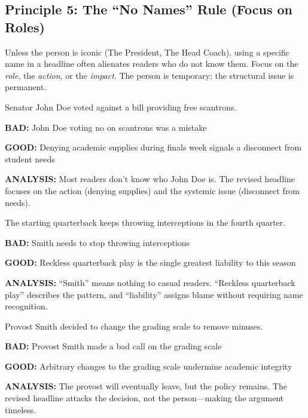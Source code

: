 \documentclass[12pt]{article}
\newcommand{\bad}[1]{\textbf{\textcolor{rose}{BAD:}} #1}
\newcommand{\good}[1]{\textbf{\textcolor{congaree}{GOOD:}} #1}
\newcommand{\context}[1]{#1}
\begin{document}
\newpage
\subsection{Principle 5: The ``No Names'' Rule (Focus on Roles)}
Unless the person is iconic (The President, The Head Coach), using a specific name in a headline often alienates readers who do not know them. Focus on the \textit{role}, the \textit{action}, or the \textit{impact}. The person is temporary; the structural issue is permanent.

\begin{exampleblock}
\context{Senator John Doe voted against a bill providing free scantrons.}

\bad{John Doe voting no on scantrons was a mistake}

\good{Denying academic supplies during finals week signals a disconnect from student needs}

\textbf{ANALYSIS:} Most readers don't know who John Doe is. The revised headline focuses on the action (denying supplies) and the systemic issue (disconnect from needs).
\end{exampleblock}

\begin{exampleblock}
\context{The starting quarterback keeps throwing interceptions in the fourth quarter.}

\bad{Smith needs to stop throwing interceptions}

\good{Reckless quarterback play is the single greatest liability to this season}

\textbf{ANALYSIS:} ``Smith'' means nothing to casual readers. ``Reckless quarterback play'' describes the pattern, and ``liability'' assigns blame without requiring name recognition.
\end{exampleblock}

\begin{exampleblock}
\context{Provost Smith decided to change the grading scale to remove minuses.}

\bad{Provost Smith made a bad call on the grading scale}

\good{Arbitrary changes to the grading scale undermine academic integrity}

\textbf{ANALYSIS:} The provost will eventually leave, but the policy remains. The revised headline attacks the decision, not the person---making the argument timeless.
\end{exampleblock}
\end{document}
